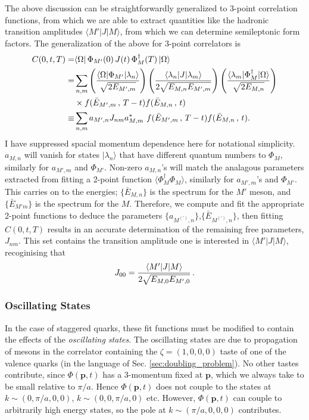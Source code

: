 The above discussion can be straightforwardly generalized to 3-point correlation functions, from which we are able to extract quantities like the hadronic transition amplitudes $\langle M' | J | M \rangle$, from which we can determine semileptonic form factors. The generalization of the above for 3-point correlators is
\begin{align}
  \nonumber
  C(0,t,T) =& \langle \Omega | \, \Phi_{M'}(0)\, J(t)\, \Phi_{M}^{\dagger}(T)\, | \Omega \rangle
  \\ \nonumber
  =& \sum_{n,m}  \left( {\langle \Omega | \Phi_{M'} | \lambda_n \rangle \over \sqrt{2E_{M',m}}} \right) \left({\langle \lambda_n | J | \lambda_m \rangle \over 2\sqrt{ E_{M,n} E_{M',m} } }\right) \left( {\langle \lambda_m | \Phi_{M}^{\dagger} | \Omega \rangle \over \sqrt{2E_{M,n}} } \right) \\ \nonumber &\times f(\bar{E}_{M',m}\,,\,T-t) f(\bar{E}_{M,n}\,,\,t) \\
  \equiv& \sum_{n,m} a_{M',n} J_{nm} a^*_{M,m} \,\, f(\bar{E}_{M',m}\,,\,T-t) f(\bar{E}_{M,n}\,,\,t).
  \label{eq:3ptfitfunction}
\end{align}
I have suppressed spacial momentum dependence here for notational simplicity. $a_{M,n}$ will vanish for states $|\lambda_n\rangle$ that have different quantum numbers to $\Phi_{M}$, similarly for $a_{M',m}$ and $\Phi_{M'}$. Non-zero $a_{M,n}$'s will match the analagous parameters extracted from fitting a 2-point function $\langle \Phi_{M}^{\dagger} \Phi_{M} \rangle$, similarly for $a_{M',m}$'s and $\Phi_{M'}$. This carries on to the energies; $\{\bar{E}_{M,n}\}$ is the spectrum for the $M'$ meson, and $\{\bar{E}_{M'm}\}$ is the spectrum for the $M$. Therefore, we compute and fit the appropriate 2-point functions to deduce the parameters $\{a_{M^{(')},n}\}$,$\{\bar{E}_{M^{(')},n}\}$, then fitting $C(0,t,T)$ results in an accurate determination of the remaining free parameters, $J_{nm}$. This set contains the transition amplitude one is interested in $\langle M' | J | M \rangle$, recoginising that
\begin{align}
  J_{00} = {\langle M' | J | M \rangle \over 2\sqrt{E_{M,0} E_{M',0} } }\,.
\end{align}

\subsubsection{Oscillating States}

In the case of staggered quarks, these fit functions must be modified to contain the effects of the {\it{oscillating states}}. The oscillating states are due to propagation of mesons in the correlator containing the $\zeta=(1,0,0,0)$ taste of one of the valence quarks (in the language of Sec. \ref{sec:doubling_problem}). No other tastes contribute, since $\Phi({{\textbf{p}}},t)$ has a 3-momentum fixed at ${\textbf{p}}$, which we always take to be small relative to $\pi/a$. Hence $\Phi({\textbf{p}},t)$ does not couple to the states at $k\sim(0,\pi/a,0,0)$, $k\sim(0,0,\pi/a,0)$ etc. However, $\Phi({\textbf{p}},t)$ can couple to arbitrarily high energy states, so the pole at $k\sim(\pi/a,0,0,0)$ contributes.

